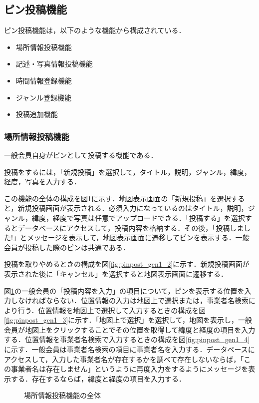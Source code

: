 \subsection{ピン投稿機能}
ピン投稿機能は，以下のような機能から構成されている．
\begin{itemize}
    \item 場所情報投稿機能
    \item 記述・写真情報投稿機能
    \item 時間情報登録機能
    \item ジャンル登録機能
    \item 投稿追加機能
\end{itemize}

\subsubsection{場所情報投稿機能}
一般会員自身がピンとして投稿する機能である．

投稿をするには，「新規投稿」を選択して，タイトル，説明，ジャンル，緯度，経度，写真を入力する．

この機能の全体の構成を図\ref{fig:pinpost_gen1_1}に示す．地図表示画面の「新規投稿」を選択すると，新規投稿画面が表示される．必須入力になっているのはタイトル，説明，ジャンル，緯度，経度で写真は任意でアップロードできる．「投稿する」を選択するとデータベースにアクセスして，投稿内容を格納する．その後，「投稿しました!」とメッセージを表示して，地図表示画面に遷移してピンを表示する．一般会員が投稿した際のピンは共通である．

投稿を取りやめるときの構成を図\ref{fig:pinpost_gen1_2}に示す．新規投稿画面が表示された後に「キャンセル」を選択すると地図表示画面に遷移する．

図\ref{fig:pinpost_gen1_1}の一般会員の「投稿内容を入力」の項目について，ピンを表示する位置を入力しなければならない．位置情報の入力は地図上で選択または，事業者名検索により行う．位置情報を地図上で選択して入力するときの構成を図\ref{fig:pinpost_gen1_3}に示す．「地図上で選択」を選択して，地図を表示し，一般会員が地図上をクリックすることでその位置を取得して緯度と経度の項目を入力する．位置情報を事業者名検索で入力するときの構成を図\ref{fig:pinpost_gen1_4}に示す．一般会員は事業者名検索の項目に事業者名を入力する．データベースにアクセスして，入力した事業者名が存在するかを調べて存在しないならば，「この事業者名は存在しません」というように再度入力をするようにメッセージを表示する．存在するならば，緯度と経度の項目を入力する．

\begin{figure}[H]
    \centering
    
    \caption{場所情報投稿機能の全体}
    \label{fig:pinpost_gen1_1}
\end{figure}

